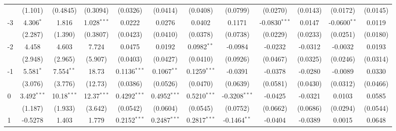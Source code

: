 \begin{table}[htbp]
\begin{tabular}{lccccccccccc}
                           & (1.101)        & (0.4845)      & (0.3094)       & (0.0326)       & (0.0414)       & (0.0408)       & (0.0799)            & (0.0270)        & (0.0143)        & (0.0172)         & (0.0145)\\   
      -3                   & 4.306$^{*}$    & 1.816         & 1.028$^{***}$  & 0.0222         & 0.0276         & 0.0402         & 0.1171              & -0.0830$^{***}$ & 0.0147          & -0.0600$^{**}$   & 0.0119\\   
                           & (2.287)        & (1.390)       & (0.3807)       & (0.0423)       & (0.0410)       & (0.0378)       & (0.0738)            & (0.0229)        & (0.0233)        & (0.0251)         & (0.0180)\\   
      -2                   & 4.458          & 4.603         & 7.724          & 0.0475         & 0.0192         & 0.0982$^{**}$  & -0.0984             & -0.0232         & -0.0312         & -0.0032          & 0.0193\\   
                           & (2.948)        & (2.965)       & (5.907)        & (0.0403)       & (0.0427)       & (0.0410)       & (0.0926)            & (0.0467)        & (0.0325)        & (0.0246)         & (0.0314)\\   
      -1                   & 5.581$^{*}$    & 7.554$^{**}$  & 18.73          & 0.1136$^{***}$ & 0.1067$^{**}$  & 0.1259$^{***}$ & -0.0391             & -0.0378         & -0.0280         & -0.0089          & 0.0330\\   
                           & (3.076)        & (3.776)       & (12.73)        & (0.0386)       & (0.0526)       & (0.0470)       & (0.0639)            & (0.0581)        & (0.0430)        & (0.0312)         & (0.0466)\\   
      0                    & 3.492$^{***}$  & 10.18$^{***}$ & 12.37$^{***}$  & 0.4292$^{***}$ & 0.4952$^{***}$ & 0.5210$^{***}$ & -0.3208$^{***}$     & -0.0425         & -0.0321         & 0.0103           & 0.0585\\   
                           & (1.187)        & (1.933)       & (3.642)        & (0.0542)       & (0.0604)       & (0.0545)       & (0.0752)            & (0.0662)        & (0.0686)        & (0.0294)         & (0.0544)\\   
      1                    & -0.5278        & 1.403         & 1.779          & 0.2152$^{***}$ & 0.2487$^{***}$ & 0.2817$^{***}$ & -0.1464$^{**}$      & -0.0404         & -0.0389         & 0.0015           & 0.0648\\   

\end{tabular}
\end{table}
